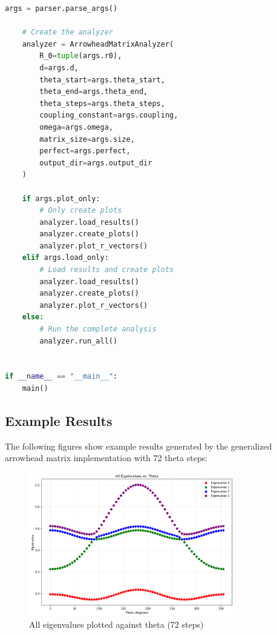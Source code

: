 \begin{lstlisting}[language=Python]
    args = parser.parse_args()
    
    # Create the analyzer
    analyzer = ArrowheadMatrixAnalyzer(
        R_0=tuple(args.r0),
        d=args.d,
        theta_start=args.theta_start,
        theta_end=args.theta_end,
        theta_steps=args.theta_steps,
        coupling_constant=args.coupling,
        omega=args.omega,
        matrix_size=args.size,
        perfect=args.perfect,
        output_dir=args.output_dir
    )
    
    if args.plot_only:
        # Only create plots
        analyzer.load_results()
        analyzer.create_plots()
        analyzer.plot_r_vectors()
    elif args.load_only:
        # Load results and create plots
        analyzer.load_results()
        analyzer.create_plots()
        analyzer.plot_r_vectors()
    else:
        # Run the complete analysis
        analyzer.run_all()


if __name__ == "__main__":
    main()
\end{lstlisting}

\subsection{Example Results}

The following figures show example results generated by the generalized arrowhead matrix implementation with 72 theta steps:

\begin{figure}[H]
    \centering
    \includegraphics[width=0.8\textwidth]{../example_use/arrowhead_matrix/testing/plots/all_eigenvalues_2d.png}
    \caption{All eigenvalues plotted against theta (72 steps)}
    \label{fig:all_eigenvalues_2d_gen_12}
\end{figure}

